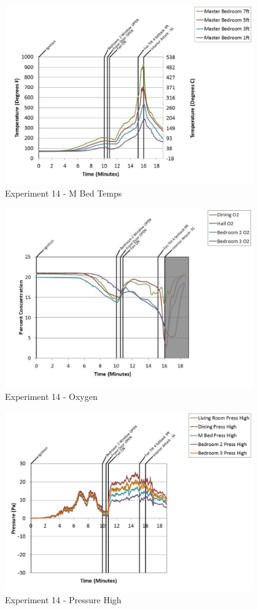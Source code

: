 \documentclass{article}
\begin{document}
\begin{appendices}
	\begin{figure}[h!]
		\centering
		\includegraphics[height=3.05in]{0_Images/Results_Charts/Exp_14_Charts/MBedTemps.pdf}
		\caption{Experiment 14 - M Bed Temps}
	\end{figure}
 
	\clearpage

	\begin{figure}[h!]
		\centering
		\includegraphics[height=3.05in]{0_Images/Results_Charts/Exp_14_Charts/Oxygen.pdf}
		\caption{Experiment 14 - Oxygen}
	\end{figure}
 

	\begin{figure}[h!]
		\centering
		\includegraphics[height=3.05in]{0_Images/Results_Charts/Exp_14_Charts/PressureHigh.pdf}
		\caption{Experiment 14 - Pressure High}
	\end{figure}
 

\end{appendices}
\end{document}
